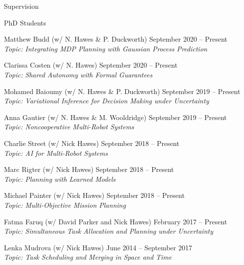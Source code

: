 
\begin{rSection}{Supervision}

\begin{rSubsection}{PhD Students}{}{}{}
\item Matthew Budd  (w/ N. Hawes \& P. Duckworth) \hfill September 2020 -- Present\\
\textit{Topic: Integrating MDP Planning with Gaussian Process Prediction}

\item Clarissa Costen  (w/ N. Hawes) \hfill September 2020 -- Present\\
\textit{Topic: Shared Autonomy with Formal Guarantees}

\item Mohamed Baioumy  (w/ N. Hawes \& P. Duckworth) \hfill September 2019 -- Present\\
\textit{Topic: Variational Inference for Decision Making under Uncertainty}

\item Anna Gautier (w/ N. Hawes \& M. Wooldridge) \hfill September 2019 -- Present\\
\textit{Topic: Noncooperative Multi-Robot Systems}

\item  Charlie Street (w/ Nick Hawes) \hfill September 2018 -- Present\\
\textit{Topic: AI for Multi-Robot Systems}

\item  Marc Rigter (w/ Nick Hawes) \hfill September 2018 -- Present\\
\textit{Topic: Planning with Learned Models}

\item  Michael Painter  (w/ Nick Hawes) \hfill September 2018 -- Present\\
\textit{Topic: Multi-Objective Mission Planning}

\item  Fatma Faruq  (w/ David Parker and Nick Hawes) \hfill February 2017 -- Present\\
\textit{Topic: Simultaneous Task Allocation and Planning under Uncertainty}

\item  Lenka Mudrova (w/ Nick Hawes) \hfill June 2014 -- September 2017\\
\textit{Topic: Task Scheduling and Merging in Space and Time}

\end{rSubsection}


\end{rSection}

